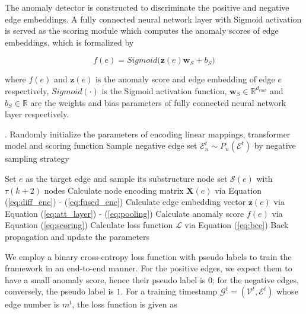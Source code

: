 \documentclass[10pt,journal,compsoc]{IEEEtran}
\begin{document}
The anomaly detector is constructed to discriminate the positive and negative edge embeddings. A fully connected neural network layer with Sigmoid activation is served as the scoring module which computes the anomaly scores of edge embeddings, which is formalized by

\begin{equation}
\label{eq:scoring}
f(e) = Sigmoid\big(\mathbf{z}(e) \mathbf{w}_S + b_S\big)
\end{equation}

\noindent where $f(e)$ and $\mathbf{z}(e)$ is the anomaly score and edge embedding of edge $e$ respectively, $Sigmoid(\cdot)$ is the Sigmoid activation function, $\mathbf{w}_S \in \mathbb{R}^{d_{emb}} $ and $b_S \in \mathbb{R}$ are the weights and bias parameters of fully connected neural network layer respectively.

\begin{algorithm}[t]
	\caption{The Overall Training Procedure of TADDY}
	\label{algo:framework}
	\renewcommand{\algorithmicrequire}{\textbf{Input:}}
	\renewcommand{\algorithmicensure}{\textbf{Output:}}
	\begin{algorithmic}[1]
		.
		\STATE Randomly initialize the parameters of encoding linear mappings, transformer model and scoring function
		\STATE Sample negative edge set $\mathcal{E}^t_n \sim P_{n}(\mathcal{E}^t)$ by negative sampling strategy
		
		\STATE Set $e$ as the target edge and sample its substructure node set $\mathcal{S}(e)$ with $\tau(k+2)$ nodes
		\STATE Calculate node encoding matrix $\mathbf{X}(e)$ via Equation (\ref{eq:diff_enc}) - (\ref{eq:fused_enc})
		\STATE Calculate edge embedding vector $\mathbf{z}(e)$ via Equation (\ref{eq:att_layer}) - (\ref{eq:pooling})
		\STATE Calculate anomaly score $f(e)$ via Equation (\ref{eq:scoring})
		\ENDFOR
		\STATE Calculate loss function $\mathcal{L}$ via Equation (\ref{eq:bce})
		\STATE Back propagation and update the parameters
		\ENDFOR
		\ENDFOR
		
	\end{algorithmic}
\end{algorithm}

We employ a binary cross-entropy loss function with pseudo labels to train the framework in an end-to-end manner. For the positive edges, we expect them to have a small anomaly score, hence their pseudo label is $0$; for the negative edges, conversely, the pseudo label is $1$. For a training timestamp $\mathcal{G}^t=(\mathcal{V}^t,\mathcal{E}^t)$ whose edge number is $m^t$, the loss function is given as
\end{document}
